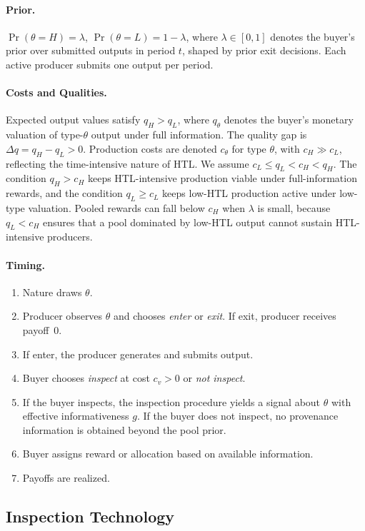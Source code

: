 \documentclass{article}
\theoremstyle{plain}
\theoremstyle{definition}
\theoremstyle{remark}
\begin{document}
\paragraph{Prior.}
$\Pr(\theta=H)=\lambda$, $\Pr(\theta=L)=1-\lambda$, where $\lambda\in[0,1]$ denotes the buyer's prior over submitted outputs in period $t$, shaped by prior exit decisions. Each active producer submits one output per period.

\paragraph{Costs and Qualities.}
Expected output values satisfy $q_H>q_L$, where $q_\theta$ denotes the buyer's monetary valuation of type-$\theta$ output under full information. The quality gap is $\Delta q = q_H - q_L > 0$. Production costs are denoted $c_\theta$ for type $\theta$, with $c_H \gg c_L$, reflecting the time-intensive nature of HTL. We assume $c_L \le q_L < c_H < q_H$. The condition $q_H > c_H$ keeps HTL-intensive production viable under full-information rewards, and the condition $q_L \ge c_L$ keeps low-HTL production active under low-type valuation. Pooled rewards can fall below $c_H$ when $\lambda$ is small, because $q_L < c_H$ ensures that a pool dominated by low-HTL output cannot sustain HTL-intensive producers. 

\paragraph{Timing.}
\begin{enumerate}
\item Nature draws $\theta$.
\item Producer observes $\theta$ and chooses \emph{enter} or \emph{exit}. If exit, producer receives payoff~$0$.
\item If enter, the producer generates and submits output.
\item Buyer chooses \emph{inspect} at cost $c_v>0$ or \emph{not inspect}.
\item If the buyer inspects, the inspection procedure yields a signal about $\theta$ with effective informativeness $g$. If the buyer does not inspect, no provenance information is obtained beyond the pool prior.
\item Buyer assigns reward or allocation based on available information.
\item Payoffs are realized.
\end{enumerate}

\subsection{Inspection Technology}
\label{app:inspection}
\end{document}

